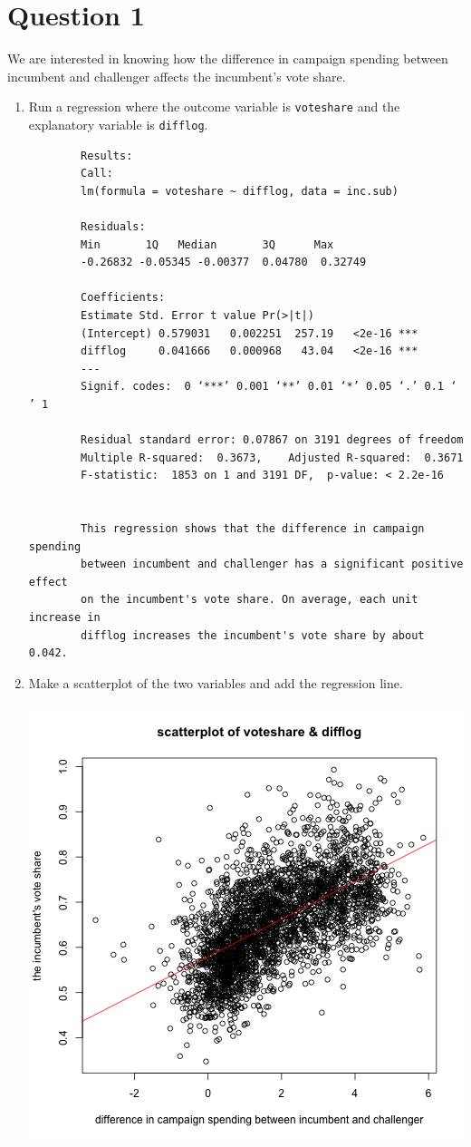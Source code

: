 \documentclass[12pt,letterpaper]{article}
\begin{document}
\section*{Question 1}
\vspace{.25cm}
\noindent We are interested in knowing how the difference in campaign spending between incumbent and challenger affects the incumbent's vote share. 
	\begin{enumerate}
		\item Run a regression where the outcome variable is \texttt{voteshare} and the explanatory variable is \texttt{difflog}.	
		
		  
		
		\begin{verbatim} 
		Results: 
		Call:
		lm(formula = voteshare ~ difflog, data = inc.sub)
		
		Residuals:
		Min       1Q   Median       3Q      Max 
		-0.26832 -0.05345 -0.00377  0.04780  0.32749 
		
		Coefficients:
		Estimate Std. Error t value Pr(>|t|)    
		(Intercept) 0.579031   0.002251  257.19   <2e-16 ***
		difflog     0.041666   0.000968   43.04   <2e-16 ***
		---
		Signif. codes:  0 ‘***’ 0.001 ‘**’ 0.01 ‘*’ 0.05 ‘.’ 0.1 ‘ ’ 1
		
		Residual standard error: 0.07867 on 3191 degrees of freedom
		Multiple R-squared:  0.3673,	Adjusted R-squared:  0.3671 
		F-statistic:  1853 on 1 and 3191 DF,  p-value: < 2.2e-16
		
		
		This regression shows that the difference in campaign spending 
		between incumbent and challenger has a significant positive effect 
		on the incumbent's vote share. On average, each unit increase in 
		difflog increases the incumbent's vote share by about 0.042.
		\end{verbatim}	
		
		\item Make a scatterplot of the two variables and add the regression line. 	
		
		  
		\includegraphics[width=.75\textwidth]{q1_regression.png}
		

\end{enumerate}
\end{document}
